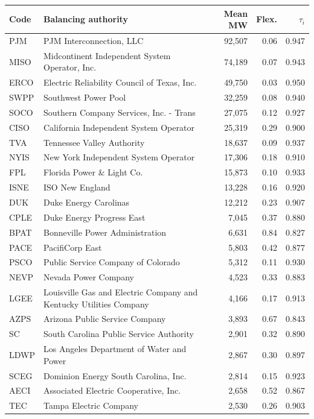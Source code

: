\begin{tabular}{@{}llrrr@{}}
\toprule
Code & Balancing authority & Mean MW & Flex. & $\tau_i$ \\
\midrule
PJM & PJM Interconnection, LLC & 92,507 & 0.06 & 0.947 \\
MISO & Midcontinent Independent System Operator, Inc. & 74,189 & 0.07 & 0.943 \\
ERCO & Electric Reliability Council of Texas, Inc. & 49,750 & 0.03 & 0.950 \\
SWPP & Southwest Power Pool & 32,259 & 0.08 & 0.940 \\
SOCO & Southern Company Services, Inc. - Trans & 27,075 & 0.12 & 0.927 \\
CISO & California Independent System Operator & 25,319 & 0.29 & 0.900 \\
TVA & Tennessee Valley Authority & 18,637 & 0.09 & 0.937 \\
NYIS & New York Independent System Operator & 17,306 & 0.18 & 0.910 \\
FPL & Florida Power \& Light Co. & 15,873 & 0.10 & 0.933 \\
ISNE & ISO New England & 13,228 & 0.16 & 0.920 \\
DUK & Duke Energy Carolinas & 12,212 & 0.23 & 0.907 \\
CPLE & Duke Energy Progress East & 7,045 & 0.37 & 0.880 \\
BPAT & Bonneville Power Administration & 6,631 & 0.84 & 0.827 \\
PACE & PacifiCorp East & 5,803 & 0.42 & 0.877 \\
PSCO & Public Service Company of Colorado & 5,312 & 0.11 & 0.930 \\
NEVP & Nevada Power Company & 4,523 & 0.33 & 0.883 \\
LGEE & Louisville Gas and Electric Company and Kentucky Utilities Company & 4,166 & 0.17 & 0.913 \\
AZPS & Arizona Public Service Company & 3,893 & 0.67 & 0.843 \\
SC & South Carolina Public Service Authority & 2,901 & 0.32 & 0.890 \\
LDWP & Los Angeles Department of Water and Power & 2,867 & 0.30 & 0.897 \\
SCEG & Dominion Energy South Carolina, Inc. & 2,814 & 0.15 & 0.923 \\
AECI & Associated Electric Cooperative, Inc. & 2,658 & 0.52 & 0.867 \\
TEC & Tampa Electric Company & 2,530 & 0.26 & 0.903 \\

\end{tabular}
